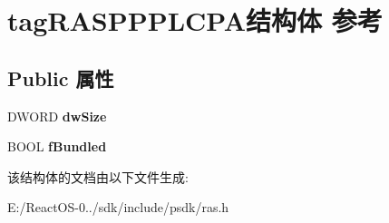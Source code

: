 \hypertarget{structtag_r_a_s_p_p_p_l_c_p_a}{}\section{tag\+R\+A\+S\+P\+P\+P\+L\+C\+P\+A结构体 参考}
\label{structtag_r_a_s_p_p_p_l_c_p_a}
\subsection*{Public 属性}
\begin{DoxyCompactItemize}
\item 
\mbox{\label{structtag_r_a_s_p_p_p_l_c_p_a_a6e5c1746a5c3c302f4279d17d5d1efc2}} 
D\+W\+O\+RD {\bfseries dw\+Size}
\item 
\mbox{\label{structtag_r_a_s_p_p_p_l_c_p_a_a1a98833095ef706634a9efe639ba65ad}} 
B\+O\+OL {\bfseries f\+Bundled}
\end{DoxyCompactItemize}


该结构体的文档由以下文件生成\+:\begin{DoxyCompactItemize}
\item 
E\+:/\+React\+O\+S-\/0../sdk/include/psdk/ras.\+h\end{DoxyCompactItemize}
